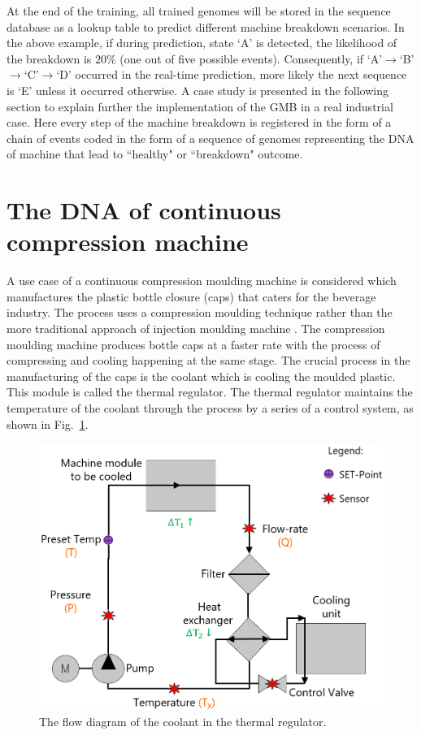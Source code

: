 \documentclass[conference]{IEEEtran}
\begin{document}
At the end of the training, all trained genomes will be stored in the sequence database as a lookup table to predict different machine breakdown scenarios. In the above example, if during prediction, state `A' is detected, the likelihood of the breakdown is $20\%$ (one out of five possible events). Consequently, if `A'$\to$`B'$\to$`C'$\to$`D' occurred in the real-time prediction, more likely the next sequence is `E' unless it occurred otherwise.
A case study is presented in the following section to explain further the implementation of the GMB in a real industrial case. Here every step of the machine breakdown is registered in the form of a chain of events coded in the form of a sequence of genomes representing the DNA of machine that lead to ``healthy" or ``breakdown" outcome.

\section{The DNA of continuous compression machine}
\label{sec:DNA_CCM}
A use case of a continuous compression moulding machine is considered which manufactures the plastic bottle closure (caps) that caters for the beverage industry. The process uses a compression moulding technique rather than the more traditional approach of injection moulding machine \cite{Liu2020}. The compression moulding \cite{Peltonen1992} machine produces bottle caps at a faster rate with the process of compressing and cooling happening at the same stage. The crucial process in the manufacturing of the caps is the coolant which is cooling the moulded plastic. This module is called the thermal regulator. The thermal regulator maintains the temperature of the coolant through the process by a series of a control system, as shown in Fig.~\ref{fig:TH_schematic}.
\begin{figure}[b]
\centerline{\includegraphics[width=0.5\linewidth]{TH_schematic.png}}
\caption{The flow diagram of the coolant in the thermal regulator.}
\label{fig:TH_schematic}
\end{figure}
\end{document}

